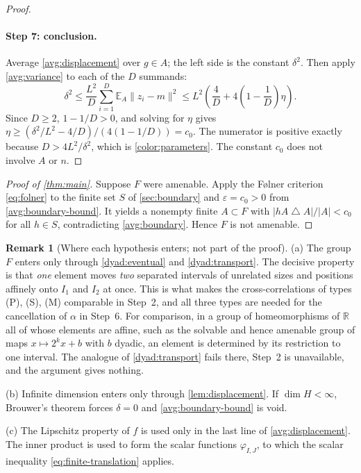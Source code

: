 \documentclass[11pt]{article}
\newcommand{\R}{\mathbb R}
\newcommand{\norm}[1]{\lVert #1\rVert}
\theoremstyle{definition}
\newtheorem{remark}[theorem]{Remark}
\numberwithin{equation}{section}
\begin{document}
\begin{proof}
\paragraph{Step 7: conclusion.}
Average \eqref{avg:displacement} over \(g\in A\); the left side is the
constant \(\delta^2\). Then apply \eqref{avg:variance} to each of the \(D\)
summands:
\[
  \delta^2
  \leq\frac{L^2}{D}\sum_{i=1}^D \mathbb E_A\norm{z_i-m}^2
  \leq L^2\left(\frac4D+4\left(1-\frac1D\right)\eta\right).
\]
Since \(D\ge2\), \(1-1/D>0\), and solving for \(\eta\) gives
\(\eta\ge(\delta^2/L^2-4/D)/(4(1-1/D))=c_0\). The numerator is positive
exactly because \(D>4L^2/\delta^2\), which is \eqref{color:parameters}. The
constant \(c_0\) does not involve \(A\) or \(n\).
\end{proof}

\begin{proof}[Proof of \cref{thm:main}]
Suppose \(F\) were amenable. Apply the F\o lner criterion
\eqref{eq:folner} to the finite set \(S\) of \cref{sec:boundary} and
\(\varepsilon=c_0>0\) from \eqref{avg:boundary-bound}. It yields a nonempty
finite \(A\subset F\) with \(|hA\mathbin{\triangle}A|/|A|<c_0\) for all
\(h\in S\), contradicting \cref{avg:boundary}. Hence \(F\) is not amenable.
\end{proof}

\begin{remark}[Where each hypothesis enters; not part of the proof]
\label{rem:hypotheses}
(a) The group \(F\) enters only through \cref{dyad:eventual} and
\cref{dyad:transport}. The decisive property is that \emph{one} element moves
\emph{two} separated intervals of unrelated sizes and positions affinely onto
\(I_1\) and \(I_2\) at once. This is what makes the cross-correlations of
types (P), (S), (M) comparable in Step~2, and all three types are needed for
the cancellation of \(\alpha\) in Step~6. For comparison, in a group of
homeomorphisms of \(\R\) all of whose elements are affine, such as the
solvable and hence amenable group of maps \(x\mapsto2^kx+b\) with \(b\)
dyadic, an element is determined by its restriction to one interval. The
analogue of \cref{dyad:transport} fails there, Step~2 is unavailable, and
the argument gives nothing.

(b) Infinite dimension enters only through \cref{lem:displacement}. If
\(\dim H<\infty\), Brouwer's theorem forces \(\delta=0\) and
\eqref{avg:boundary-bound} is void.

(c) The Lipschitz property of \(f\) is used only in the last line of
\eqref{avg:displacement}. The inner product is used to form the scalar
functions \(\varphi_{I,J}\), to which the scalar inequality
\eqref{eq:finite-translation} applies.
\end{remark}
\end{document}
